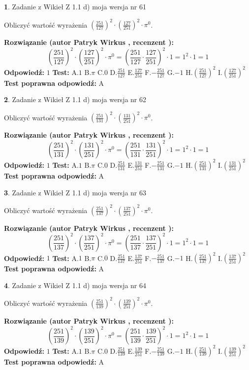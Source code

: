 \documentclass[12pt, a4paper]{article}
\theoremstyle{definition} %
\newtheorem{zad}{}
\newcommand{\zadStart}[1]{\begin{zad}#1\newline}
\newcommand{\zadStop}{\end{zad}}
\newcommand{\rozwStart}[2]{\noindent \textbf{Rozwiązanie (autor #1 , recenzent #2): }\newline}
\newcommand{\rozwStop}{\newline}
\newcommand{\odpStart}{\noindent \textbf{Odpowiedź:}\newline}
\newcommand{\odpStop}{\newline}
\newcommand{\testStart}{\noindent \textbf{Test:}\newline}
\newcommand{\testStop}{\newline}
\newcommand{\kluczStart}{\noindent \textbf{Test poprawna odpowiedź:}\newline}
\newcommand{\kluczStop}{\newline}
\begin{document}
\zadStart{Zadanie z Wikieł Z 1.1 d) moja wersja nr 61}

Obliczyć wartość wyrażenia $(\frac{251}{127})^{2} \cdot (\frac{127}{251})^{2} \cdot \pi^{0}$.
\zadStop
\rozwStart{Patryk Wirkus}{}
$$(\frac{251}{127})^{2} \cdot (\frac{127}{251})^{2} \cdot \pi^{0} = (\frac{251}{127} \cdot \frac{127}{251})^{2} \cdot 1 = 1^{2} \cdot 1 = 1$$
\rozwStop
\odpStart
$1$
\odpStop
\testStart
A.$1$ B.$\pi$ C.$0$ D.$\frac{251}{127}$ E.$\frac{127}{251}$
F.$-\frac{251}{127}$ G.$-1$
H.$(\frac{251}{127})^{2}$
I.$(\frac{127}{251})^{2}$
\testStop
\kluczStart
A
\kluczStop



\zadStart{Zadanie z Wikieł Z 1.1 d) moja wersja nr 62}

Obliczyć wartość wyrażenia $(\frac{251}{131})^{2} \cdot (\frac{131}{251})^{2} \cdot \pi^{0}$.
\zadStop
\rozwStart{Patryk Wirkus}{}
$$(\frac{251}{131})^{2} \cdot (\frac{131}{251})^{2} \cdot \pi^{0} = (\frac{251}{131} \cdot \frac{131}{251})^{2} \cdot 1 = 1^{2} \cdot 1 = 1$$
\rozwStop
\odpStart
$1$
\odpStop
\testStart
A.$1$ B.$\pi$ C.$0$ D.$\frac{251}{131}$ E.$\frac{131}{251}$
F.$-\frac{251}{131}$ G.$-1$
H.$(\frac{251}{131})^{2}$
I.$(\frac{131}{251})^{2}$
\testStop
\kluczStart
A
\kluczStop



\zadStart{Zadanie z Wikieł Z 1.1 d) moja wersja nr 63}

Obliczyć wartość wyrażenia $(\frac{251}{137})^{2} \cdot (\frac{137}{251})^{2} \cdot \pi^{0}$.
\zadStop
\rozwStart{Patryk Wirkus}{}
$$(\frac{251}{137})^{2} \cdot (\frac{137}{251})^{2} \cdot \pi^{0} = (\frac{251}{137} \cdot \frac{137}{251})^{2} \cdot 1 = 1^{2} \cdot 1 = 1$$
\rozwStop
\odpStart
$1$
\odpStop
\testStart
A.$1$ B.$\pi$ C.$0$ D.$\frac{251}{137}$ E.$\frac{137}{251}$
F.$-\frac{251}{137}$ G.$-1$
H.$(\frac{251}{137})^{2}$
I.$(\frac{137}{251})^{2}$
\testStop
\kluczStart
A
\kluczStop



\zadStart{Zadanie z Wikieł Z 1.1 d) moja wersja nr 64}

Obliczyć wartość wyrażenia $(\frac{251}{139})^{2} \cdot (\frac{139}{251})^{2} \cdot \pi^{0}$.
\zadStop
\rozwStart{Patryk Wirkus}{}
$$(\frac{251}{139})^{2} \cdot (\frac{139}{251})^{2} \cdot \pi^{0} = (\frac{251}{139} \cdot \frac{139}{251})^{2} \cdot 1 = 1^{2} \cdot 1 = 1$$
\rozwStop
\odpStart
$1$
\odpStop
\testStart
A.$1$ B.$\pi$ C.$0$ D.$\frac{251}{139}$ E.$\frac{139}{251}$
F.$-\frac{251}{139}$ G.$-1$
H.$(\frac{251}{139})^{2}$
I.$(\frac{139}{251})^{2}$
\testStop
\kluczStart
A
\kluczStop
\end{document}
